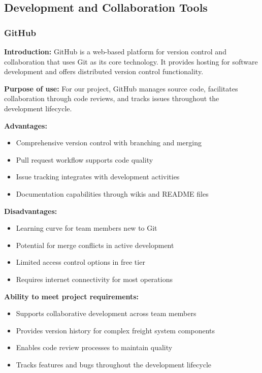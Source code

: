 \subsection{Development and Collaboration Tools}
\subsubsection{GitHub}
\textbf{Introduction:} GitHub \cite{github} is a web-based platform for version control and collaboration that uses Git as its core technology. It provides hosting for software development and offers distributed version control functionality.

\textbf{Purpose of use:} For our project, GitHub manages source code, facilitates collaboration through code reviews, and tracks issues throughout the development lifecycle.

\textbf{Advantages:}
\begin{itemize}
    \item Comprehensive version control with branching and merging
    \item Pull request workflow supports code quality
    \item Issue tracking integrates with development activities
    \item Documentation capabilities through wikis and README files
\end{itemize}

\textbf{Disadvantages:}
\begin{itemize}
    \item Learning curve for team members new to Git
    \item Potential for merge conflicts in active development
    \item Limited access control options in free tier
    \item Requires internet connectivity for most operations
\end{itemize}

\textbf{Ability to meet project requirements:}
\begin{itemize}
    \item Supports collaborative development across team members
    \item Provides version history for complex freight system components
    \item Enables code review processes to maintain quality
    \item Tracks features and bugs throughout the development lifecycle
\end{itemize}

